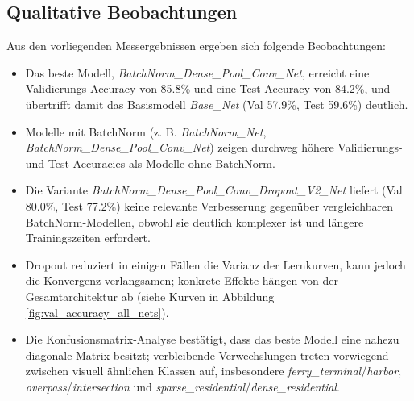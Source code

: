 \subsection{Qualitative Beobachtungen}
Aus den vorliegenden Messergebnissen ergeben sich folgende Beobachtungen:
\begin{itemize}
    \item Das beste Modell, \emph{BatchNorm\_Dense\_Pool\_Conv\_Net}, erreicht
          eine Validierungs-Accuracy von 85.8\% und eine Test-Accuracy von
          84.2\%, und übertrifft damit das Basismodell \emph{Base\_Net}
          (Val 57.9\%, Test 59.6\%) deutlich.
    \item Modelle mit BatchNorm (z. B. \emph{BatchNorm\_Net},
          \emph{BatchNorm\_Dense\_Pool\_Conv\_Net}) zeigen durchweg höhere
          Validierungs- und Test-Accuracies als Modelle ohne BatchNorm.
    \item Die Variante \emph{BatchNorm\_Dense\_Pool\_Conv\_Dropout\_V2\_Net}
          liefert (Val 80.0\%, Test 77.2\%) keine relevante Verbesserung
          gegenüber vergleichbaren BatchNorm-Modellen, obwohl sie deutlich
          komplexer ist und längere Trainingszeiten erfordert.
    \item Dropout reduziert in einigen Fällen die Varianz der Lernkurven,
          kann jedoch die Konvergenz verlangsamen; konkrete Effekte hängen von der
          Gesamtarchitektur ab (siehe Kurven in Abbildung \ref{fig:val_accuracy_all_nets}).
    \item Die Konfusionsmatrix-Analyse bestätigt, dass das beste Modell eine
          nahezu diagonale Matrix besitzt; verbleibende Verwechslungen treten
          vorwiegend zwischen visuell ähnlichen Klassen auf, insbesondere
          \emph{ferry\_terminal}/\emph{harbor}, \emph{overpass}/\emph{intersection}
          und \emph{sparse\_residential}/\emph{dense\_residential}.
\end{itemize}